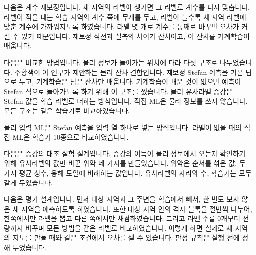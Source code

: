 

다음은 계수 재보정입니다. 새 지역의 라벨이 생기면 그 라벨로 계수를 다시 맞춥니다. 라벨이 적을 때는 학습 지역의 계수 쪽에 무게를 두고, 라벨이 늘수록 새 지역 라벨에 맞춘 계수에 가까워지도록 하였습니다. 라벨 몇 개로 계수를 통째로 바꾸면 오차가 커질 수 있기 때문입니다. 재보정 직선과 실측의 차이가 잔차이고, 이 잔차를 기계학습이 배웁니다.



다음은 비교한 방법입니다. 물리 정보가 들어가는 위치에 따라 다섯 구조로 나누었습니다. 주황색이 이 연구가 제안하는 물리 잔차 결합입니다. 재보정 Stefan 예측을 기본 답으로 두고, 기계학습은 남은 잔차만 배웁니다. 기계학습이 배운 것이 없으면 예측이 Stefan 식으로 돌아가도록 하기 위해 이 구조를 썼습니다. 물리 유사라벨 증강은 Stefan 값을 학습 라벨로 더하는 방식입니다. 직접 ML은 물리 정보를 쓰지 않습니다. 모든 구조는 같은 학습기로 비교하였습니다.


\begin{optbox}
물리 입력 ML은 Stefan 예측을 입력 열 하나로 넣는 방식입니다. 라벨이 없을 때의 직접 ML은 학습기 10종으로 비교하였습니다.
\end{optbox}


다음은 증강의 대조 실험 설계입니다. 증강의 이득이 물리 정보에서 오는지 확인하기 위해 유사라벨의 값만 바꾼 위약 네 가지를 만들었습니다. 위약은 순서를 섞은 값, 두 가지 평균 상수, 융해 도일에 비례하는 값입니다. 유사라벨의 자리와 수, 학습기는 모두 같게 두었습니다.



다음은 평가 설계입니다. 먼저 대상 지역과 그 주변을 학습에서 빼서, 한 번도 보지 않은 새 지역을 예측하도록 하였습니다. 또한 대상 지역 안의 격자 블록을 절반씩 나누어, 한쪽에서만 라벨을 뽑고 다른 쪽에서만 채점하였습니다. 그리고 라벨 수를 0개부터 전량까지 바꾸며 모든 방법을 같은 라벨로 비교하였습니다. 이렇게 하면 실제로 새 지역의 지도를 만들 때와 같은 조건에서 오차를 잴 수 있습니다. 판정 규칙은 실행 전에 정해 두었습니다.

